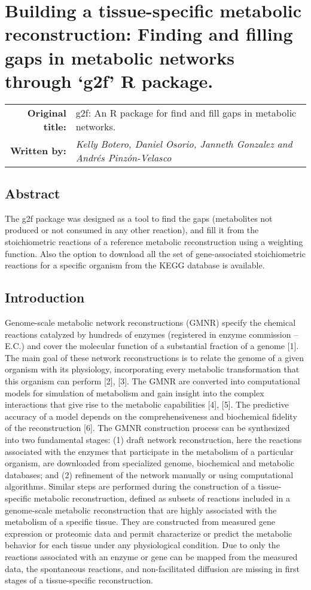 \chapter[g2f: An R package for find and fill gaps in metabolic networks.]{Building a tissue-specific metabolic reconstruction: Finding and filling gaps in metabolic networks through `g2f' R package.}
\begin{tabular}{rm{12.5cm}}
\textsf{\textbf{Original title:}}& g2f: An R package for find and fill gaps in metabolic networks.\\
\textsf{\textbf{Written by:}} & \textit{Kelly Botero, Daniel Osorio, Janneth Gonzalez and Andrés Pinzón-Velasco}\\ 
\end{tabular}
\section*{Abstract}
The g2f package was designed as a tool to find the gaps (metabolites not produced or not consumed in any other reaction), and fill it from the stoichiometric reactions of a reference metabolic reconstruction using a weighting function. Also the option to download all the set of gene-associated stoichiometric reactions for a specific organism from the KEGG database is available.
\section{Introduction}
Genome-scale metabolic network reconstructions (GMNR) specify the chemical reactions catalyzed by hundreds of enzymes (registered in enzyme commission – E.C.) and cover the molecular function of a substantial fraction of a genome [1]. The main goal of these network reconstructions is to relate the genome of a given organism with its physiology, incorporating every metabolic transformation that this organism can perform [2], [3]. The GMNR are converted into computational models for simulation of metabolism and gain insight into the complex interactions that give rise to the metabolic capabilities [4], [5]. The predictive accuracy of a model depends on the comprehensiveness and biochemical fidelity of the reconstruction [6]. The GMNR construction process can be synthesized into two fundamental stages: (1) draft network reconstruction, here the reactions associated with the enzymes that participate in the metabolism of a particular organism, are downloaded from specialized genome, biochemical and metabolic databases; and (2) refinement of the network manually or using computational algorithms. Similar steps are performed during the construction of a tissue-specific metabolic reconstruction, defined as subsets of reactions included in a genome-scale metabolic reconstruction that are highly associated with  the metabolism of a specific tissue. They are constructed from measured gene expression or proteomic data and permit characterize or predict the metabolic behavior for each tissue under any physiological condition. Due to only the reactions associated with an enzyme or gene can be mapped from the measured data, the spontaneous reactions, and non-facilitated diffusion are missing in first stages of a tissue-specific reconstruction.\\

